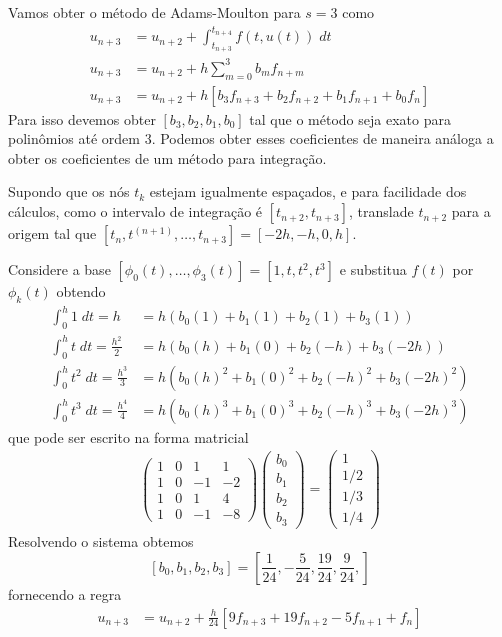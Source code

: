 \begin{ex}
Vamos obter o método de Adams-Moulton para $s=3$ como
\begin{eqnarray}\label{AM4}
  u_{n+3}  &= u_{n+2}  + \int _{t_{n+3}}^{t_{n+4}} f(t,u(t)) \; dt \\
  u_{n+3}  &= u_{n+2}  + h \sum_{m=0}^{3} b_m f_{n+m} \\
  u_{n+3}  &= u_{n+2}  + h [b_3f_{n+3} +b_2f_{n+2} +b_1f_{n+1} +b_0f_n]
\end{eqnarray}
Para isso devemos obter $[b_3,b_2,b_1,b_0]$ tal que o método seja exato para polinômios até ordem $3$. Podemos obter esses coeficientes de maneira análoga a obter os coeficientes de um método para integração.

Supondo que os nós $t_k$ estejam igualmente espaçados, e para facilidade dos cálculos, como o intervalo de integração é $[t_{n+2},t_{n+3}]$, translade $t_{n+2}$ para a origem tal que $[t_n,t^{(n+1)},\ldots ,t_{n+3}]=[-2h,-h,0,h]$.

Considere a base $[\phi _0(t),\ldots ,\phi _3(t)]=[1, t, t^2, t^3]$ e substitua $f(t)$ por $\phi _k(t)$ obtendo
\begin{eqnarray*}
      \int _0^{h} 1  \;dt = h             &= h( b_0(1)  +b_1(1)   + b_2(1)   + b_3(1)    )\\
      \int _0^{h} t  \;dt = \frac{h^2}{2}  &= h( b_0(h)  +b_1(0)   + b_2(-h) + b_3(-2h)  )\\
      \int _0^{h} t^2 \;dt = \frac{h^3}{3}  &= h( b_0(h)^2 +b_1(0)^2  + b_2(-h)^2+ b_3(-2h)^2 )\\
      \int _0^{h} t^3 \;dt = \frac{h^4}{4} &= h( b_0(h)^3 +b_1(0)^3  + b_2(-h)^3+ b_3(-2h)^3 )
\end{eqnarray*}
que pode ser escrito na forma matricial
\begin{eqnarray}
\left(
  \begin{array}{cccc}
    1  & 0 & 1    & 1   \\
    1  & 0 & -1   & -2  \\
    1  & 0 & 1    & 4   \\
    1  & 0 & -1   & -8
  \end{array}
\right)
\left(\begin{array}{c}  b_0 \\ b_1\\ b_2\\b_3   \end{array}\right)
=
\left(\begin{array}{c}  1  \\ 1/2 \\ 1/3 \\ 1/4  \end{array}\right)
\end{eqnarray}
Resolvendo o sistema obtemos
$$[b_0,b_1,b_2,b_3]=[\frac{1}{24},-\frac{5}{24},\frac{19}{24},\frac{9}{24},]$$
fornecendo a regra
\begin{eqnarray}
  u_{n+3}  &= u_{n+2}  + \frac{h}{24} [9 f_{n+3} +19f_{n+2} -5f_{n+1} +f_n]
\end{eqnarray}
\end{ex}

